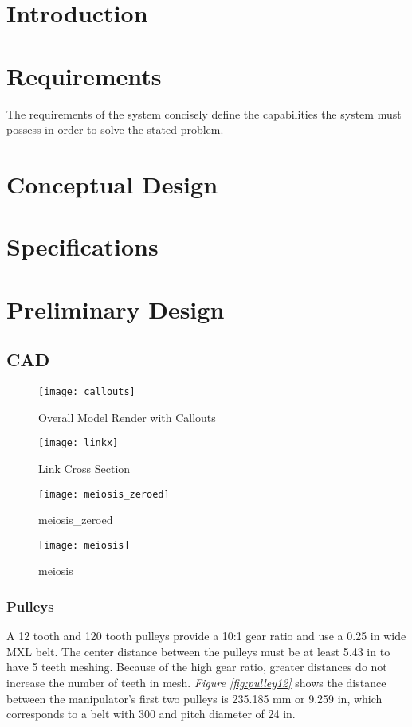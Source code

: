 \section{Introduction}
\section{Requirements}
The requirements of the system concisely define the capabilities the system must possess in order to solve the stated problem.

\newpage
\section{Conceptual Design}

\newpage
\section{Specifications}

\newpage
\section{Preliminary Design}
\subsection{CAD}

\begin{figure}[htp]
  \center
  \texttt{[image: callouts]}
  \caption{Overall Model Render with Callouts}
  \label{fig:callouts}
\end{figure}
\begin{figure}[htp]
  \center
  \texttt{[image: linkx]}
  \caption{Link Cross Section}
  \label{fig:linkx}
\end{figure}
\begin{figure}[htp]
  \center
  \texttt{[image: meiosis\_zeroed]}
  \caption{meiosis\_zeroed}
  \label{fig:meiosis_zeroed}
\end{figure}
\begin{figure}[htp]
  \center
  \texttt{[image: meiosis]}
  \caption{meiosis}
  \label{fig:meiosis}
\end{figure}
\newpage\null\newpage\null
\subsubsection{Pulleys}
A 12 tooth and 120 tooth pulleys provide a 10:1 gear ratio and use a 0.25 in wide MXL belt. The center distance between the pulleys must be at least 5.43 in to have 5 teeth meshing. Because of the high gear ratio, greater distances do not increase the number of teeth in mesh. \emph{Figure \ref{fig:pulley12}} shows the distance between the manipulator’s first two pulleys is 235.185 mm or 9.259 in, which corresponds to a belt with 300 and pitch diameter of 24 in.

